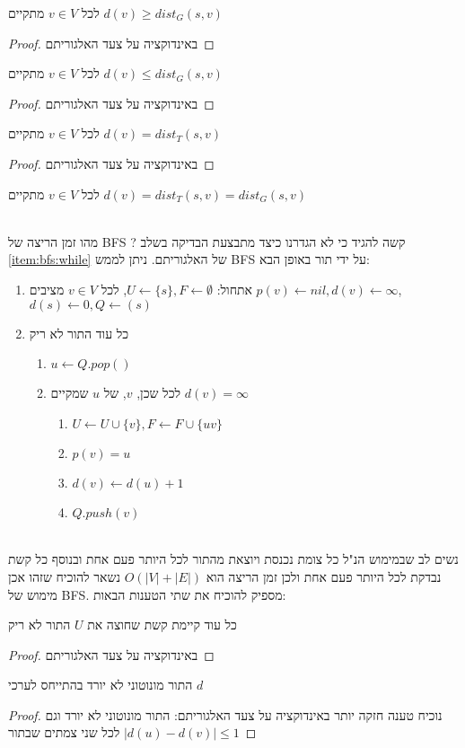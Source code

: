 \begin{claim}
לכל
$v \in V$
מתקיים
$d(v) \geq dist_G(s, v)$
\end{claim}
\begin{proof}
באינדוקציה על צעד האלגוריתם
\end{proof}

\begin{claim}
לכל
$v \in V$
מתקיים
$d(v) \leq dist_G(s,v)$
\end{claim}
\begin{proof}
באינדוקציה על צעד האלגוריתם
\end{proof}

\begin{claim}
לכל
$v \in V$
מתקיים
$d(v) = dist_T(s,v)$
\end{claim}
\begin{proof}
באינדוקציה על צעד האלגוריתם
\end{proof}


\begin{theorem}
לכל
$v \in V$
מתקיים
$d(v) = dist_T(s,v) = dist_G(s,v)$
\end{theorem}
\\
\noindent
מהו זמן הריצה של BFS ? קשה להגיד כי לא הגדרנו כיצד מתבצעת הבדיקה בשלב 
\ref{item:bfs:while}
של האלגוריתם. 
ניתן לממש BFS על ידי תור באופן הבא:
\begin{enumerate}
\item
אתחול:
$U \leftarrow \{s\}, F \leftarrow \emptyset$, 
לכל 
$v \in V$
מציבים
$p(v) \leftarrow nil, d(v) \leftarrow \infty$,
$d(s) \leftarrow 0, Q \leftarrow (s)$
\item 
כל עוד התור לא ריק 
\begin{enumerate}
	\item
	$u \leftarrow Q.pop()$
\item
לכל שכן, $v$, של $u$ שמקיים 
$d(v) = \infty$
		\begin{enumerate}
		\item
		$U \leftarrow U \cup \{v\}, F \leftarrow F \cup \{uv\}$
		\item
		$p(v) = u$
		\item
		$d(v) \leftarrow d(u) + 1$
		\item
		$Q.push(v)$
		\end{enumerate}
	\end{enumerate}
\end{enumerate}
\\
\noindent
נשים לב שבמימוש הנ"ל כל צומת נכנסת ויוצאת מהתור לכל היותר פעם אחת 
ובנוסף כל קשת נבדקת לכל היותר פעם אחת ולכן זמן הריצה הוא 
$O(|V| + |E|)$
נשאר להוכיח שזהו אכן מימוש של BFS.
מספיק להוכיח את שתי הטענות הבאות:
\begin{claim}
כל עוד קיימת קשת שחוצה את $U$ התור לא ריק
\end{claim}
\begin{proof}
באינדוקציה על צעד האלגוריתם
\end{proof}

\begin{claim}
התור מונוטוני לא יורד בהתייחס לערכי 
$d$
\end{claim}
\begin{proof}
נוכיח טענה חזקה יותר באינדוקציה על צעד האלגוריתם: 
התור מונוטוני לא יורד וגם 
$|d(u) - d(v)| \leq 1$
לכל שני צמתים שבתור
\end{proof}
